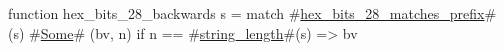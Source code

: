 function hex_bits_28_backwards s =
  match #\hyperref[sailRISCVzhexzybitszy28zymatcheszyprefix]{hex\_bits\_28\_matches\_prefix}#(s) {
      #\hyperref[sailRISCVzSome]{Some}# (bv, n) if n == #\hyperref[sailRISCVzstringzylength]{string\_length}#(s) => bv
  }
